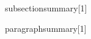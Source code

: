 
\ifdefined\TOPLEVEL
\else 
\usepackage{xparse}
\usepackage{comment}

\newenvironment{sectionsummary}[1]%
{
}

\newenvironment{subsectionsummary}[1]%
{
}

\newenvironment{subsubsectionsummary}[1]%
{
}

\newenvironment{paragraphsummary}[1]%
{
}

\newenvironment{subparagraphsummary}[1]%
{
}

\fi